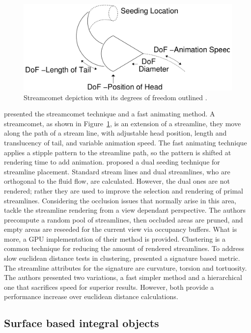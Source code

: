 \begin{figure}[htbp]
	\centering
	\includegraphics[scale=.2]{images/streamComet}
	\caption{Streamcomet depiction with its degrees of freedom outlined \cite{Laramee2005}.}
	\label{fig:streamComent}
\end{figure}

\cite{Laramee2005} presented the streamcomet technique and a fast animating method.
A streamcomet, as shown in Figure~\ref{fig:streamComent}, is an extension of a streamline, they move along the path of a stream line, with adjustable head position, length and translucency of tail, and variable animation speed.
The fast animating technique applies a stipple pattern to the streamline path, so the pattern is shifted at rendering time to add animation.
\cite{Rosanwo2009} proposed a dual seeding technique for streamline placement.
Standard stream lines and dual streamlines, who are orthogonal to the fluid flow, are calculated.
However, the dual ones are not rendered; rather they are used to improve the selection and rendering of  primal streamlines.
Considering the occlusion issues that normally arise in this area, \cite{Marchesin2010} tackle the streamline rendering from a view dependant perspective.
The authors precompute a random pool of streamlines, then occluded areas are pruned, and empty areas are reseeded for the current view via occupancy buffers.
What is more, a GPU implementation of their method is provided.
Clustering is a common technique for reducing the amount of rendered streamlines.
To address slow euclidean distance tests in clustering, \cite{McLoughlin2013} presented a signature based metric.
The streamline attributes for the signature are curvature, torsion and tortuosity.
The authors presented two variations, a fast simpler method and a hierarchical one that sacrifices speed for superior results.
However, both provide a performance increase over euclidean distance calculations.

\subsection{Surface based integral objects}

